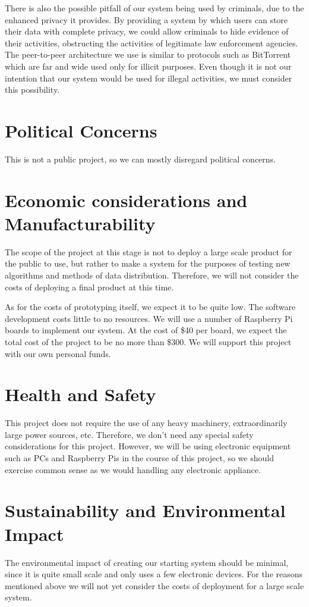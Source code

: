 	There is also the possible pitfall of our system being used by criminals, due to the enhanced privacy it provides.  By providing a system by which users can store their data with complete privacy, we could allow criminals to hide evidence of their activities, obstructing the activities of legitimate law enforcement agencies. The peer-to-peer architecture we use is similar to protocols such as BitTorrent which are far and wide used only for illicit purposes.  Even though it is not our intention that our system would be used for illegal activities, we must consider this possibility.

\section{Political Concerns}
	This is not a public project, so we can mostly disregard political concerns.

\section{Economic considerations and Manufacturability}
	The scope of the project at this stage is not to deploy a large scale product for the public to use, but rather to make a system for the purposes of testing new algorithms and methods of data distribution.  Therefore, we will not consider the costs of deploying a final product at this time.

	As for the costs of prototyping itself, we expect it to be quite low.  The software development costs little to no resources.  We will use a number of Raspberry Pi boards to implement our system.  At the cost of \$40 per board, we expect the total cost of the project to be no more than \$300.  We will support this project with our own personal funds.

\section{Health and Safety}
	This project does not require the use of any heavy machinery, extraordinarily large power sources, etc.  Therefore, we don't need any special safety considerations for this project.  However, we will be using electronic equipment such as PCs and Raspberry Pis in the course of this project, so we should exercise common sense as we would handling any electronic appliance.

\section{Sustainability and Environmental Impact}
	The environmental impact of creating our starting system should be minimal, since it is quite small scale and only uses a few electronic devices.  For the reasons mentioned above we will not yet consider the costs of deployment for a large scale system.

